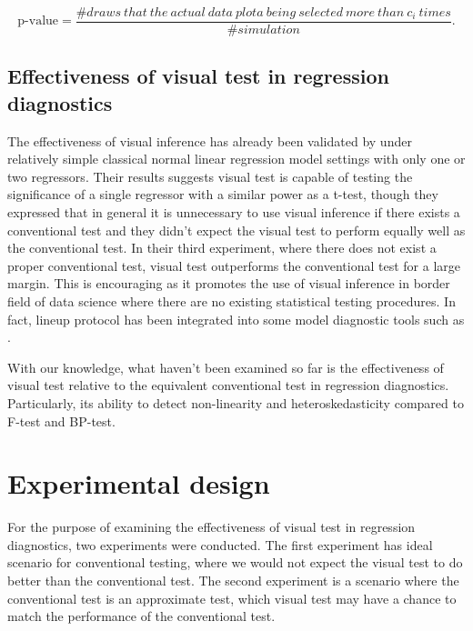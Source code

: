 \documentclass[]{interact}
\theoremstyle{plain}%
\theoremstyle{definition}
\theoremstyle{remark}
\begin{document}
\begin{equation} \label{eq:p-value-multi}
\text{p-value} = \frac{\#draws~that~the~actual~data~plota~being~selected~more~than~c_i~times}{\#simulation}.
\end{equation}

\hypertarget{effectiveness-of-visual-test-in-regression-diagnostics}{%
\subsection{Effectiveness of visual test in regression
diagnostics}\label{effectiveness-of-visual-test-in-regression-diagnostics}}

The effectiveness of visual inference has already been validated by
\citet{majumder_validation_2013} under relatively simple classical
normal linear regression model settings with only one or two regressors.
Their results suggests visual test is capable of testing the
significance of a single regressor with a similar power as a t-test,
though they expressed that in general it is unnecessary to use visual
inference if there exists a conventional test and they didn't expect the
visual test to perform equally well as the conventional test. In their
third experiment, where there does not exist a proper conventional test,
visual test outperforms the conventional test for a large margin. This
is encouraging as it promotes the use of visual inference in border
field of data science where there are no existing statistical testing
procedures. In fact, lineup protocol has been integrated into some model
diagnostic tools such as \citet{loy2013diagnostic}.

With our knowledge, what haven't been examined so far is the
effectiveness of visual test relative to the equivalent conventional
test in regression diagnostics. Particularly, its ability to detect
non-linearity and heteroskedasticity compared to F-test and BP-test.

\hypertarget{experimental-design}{%
\section{Experimental design}\label{experimental-design}}

For the purpose of examining the effectiveness of visual test in
regression diagnostics, two experiments were conducted. The first
experiment has ideal scenario for conventional testing, where we would
not expect the visual test to do better than the conventional test. The
second experiment is a scenario where the conventional test is an
approximate test, which visual test may have a chance to match the
performance of the conventional test.
\end{document}
